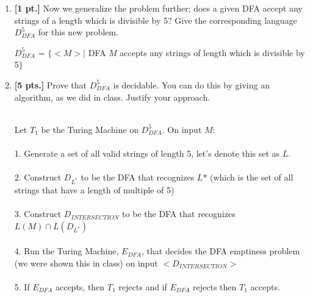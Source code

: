 \documentclass[11pt]{article}
\theoremstyle{definition}
\theoremstyle{theorem}
\newcommand{\solution}{\medskip\noindent{\color{blue}\textbf{Solution:}}}
\begin{document}
\begin{enumerate}[label=(\alph*)]
\item \textbf{[1 pt.]} Now we generalize the problem further; does a given DFA accept any strings of a length which is divisible by 5? Give the corresponding language $D^5_{DFA}$ for this new problem.

\solution


$D^5_{DFA}$ = $\{<M> |$ DFA $M$ accepts any strings of length which is divisible by 5$\}$




\item \textbf{[5 pts.]} Prove that $D^5_{DFA}$ is decidable. You can do this by giving an algorithm, as we did in class. Justify your approach.

\solution
\\
Let $T_1$ be the Turing Machine on $D^5_{DFA}$. On input $M$: \\ ~ \\ 
1. Generate a set of all valid strings of length 5, let's denote this set as $L$. \\ ~ \\
2. Construct $D_{L^*}$ to be the DFA that recognizes $L$* (which is the set of all strings that have a length of multiple of 5)  \\ ~ \\
3. Construct $D_{INTERSECTION}$ to be the DFA that recognizes $L(M) \cap L(D_{L^*})$ \\ ~ \\
4. Run the Turing Machine, $E_{DFA}$, that decides the DFA emptiness problem (we were shown this in class) on input $<D_{INTERSECTION}>$ \\ ~ \\
5. If $E_{DFA}$ accepts, then $T_1$ rejects and if $E_{DFA}$ rejects then $T_1$ accepts. \\ ~ \\


\end{enumerate}
\end{document}
